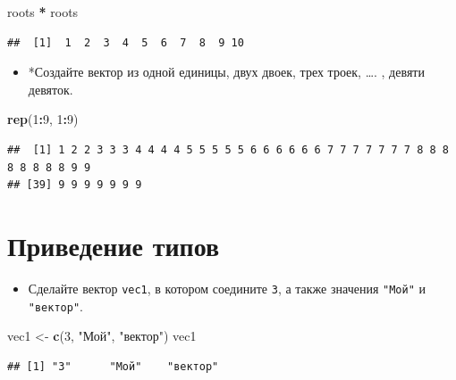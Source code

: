 \documentclass[]{book}
\newenvironment{Shaded}{\begin{snugshade}}{\end{snugshade}}
\newcommand{\KeywordTok}[1]{\textcolor[rgb]{0.13,0.29,0.53}{\textbf{#1}}}
\newcommand{\DecValTok}[1]{\textcolor[rgb]{0.00,0.00,0.81}{#1}}
\newcommand{\StringTok}[1]{\textcolor[rgb]{0.31,0.60,0.02}{#1}}
\newcommand{\OperatorTok}[1]{\textcolor[rgb]{0.81,0.36,0.00}{\textbf{#1}}}
\newcommand{\NormalTok}[1]{#1}
\providecommand{\tightlist}{%
  \setlength{\itemsep}{0pt}\setlength{\parskip}{0pt}}
\begin{document}
\begin{Shaded}
\begin{Highlighting}[]
\NormalTok{roots }\OperatorTok{*}\StringTok{ }\NormalTok{roots}
\end{Highlighting}
\end{Shaded}

\begin{verbatim}
##  [1]  1  2  3  4  5  6  7  8  9 10
\end{verbatim}

\begin{itemize}
\tightlist
\item
  *Создайте вектор из одной единицы, двух двоек, трех троек, \ldots{}. ,
  девяти девяток.
\end{itemize}

\begin{Shaded}
\begin{Highlighting}[]
\KeywordTok{rep}\NormalTok{(}\DecValTok{1}\OperatorTok{:}\DecValTok{9}\NormalTok{, }\DecValTok{1}\OperatorTok{:}\DecValTok{9}\NormalTok{)}
\end{Highlighting}
\end{Shaded}

\begin{verbatim}
##  [1] 1 2 2 3 3 3 4 4 4 4 5 5 5 5 5 6 6 6 6 6 6 7 7 7 7 7 7 7 8 8 8 8 8 8 8 8 9 9
## [39] 9 9 9 9 9 9 9
\end{verbatim}

\section{Приведение типов}\label{solution_coer}

\begin{itemize}
\tightlist
\item
  Сделайте вектор \texttt{vec1}, в котором соедините \texttt{3}, а также
  значения \texttt{"Мой"} и \texttt{"вектор"}.
\end{itemize}

\begin{Shaded}
\begin{Highlighting}[]
\NormalTok{vec1 <-}\StringTok{ }\KeywordTok{c}\NormalTok{(}\DecValTok{3}\NormalTok{, }\StringTok{"Мой"}\NormalTok{, }\StringTok{"вектор"}\NormalTok{)}
\NormalTok{vec1}
\end{Highlighting}
\end{Shaded}

\begin{verbatim}
## [1] "3"      "Мой"    "вектор"
\end{verbatim}
\end{document}
